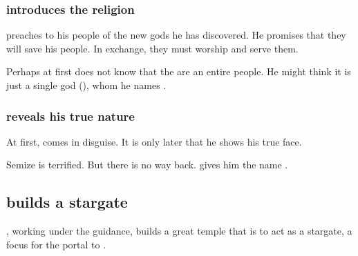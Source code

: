 \subsubsection{\Semiza{} introduces the \bane{} religion}
\Semiza{} preaches to his people of the new gods he has discovered. He promises that they will save his people. In exchange, they must worship and serve them. 

Perhaps at first \Semiza{} does not know that the \banes{} are an entire people. He might think it is just a single god (\Daggerrain), whom he names . 





\subsubsection{\Daggerrain{} reveals his true nature}

At first, \Daggerrain{} comes in disguise. 
It is only later that he shows \Semiza{} his true face.


Semize is terrified. 
But there is no way back. 
\Semiza{} gives him the name \quo{\Daggerrain}. 










\subsection{\Semiza{} builds a stargate}
\Semiza{}, working under the \psp{\banelords}{} guidance, builds a great temple that is to act as a stargate, a focus for the portal to \Erebos. 









